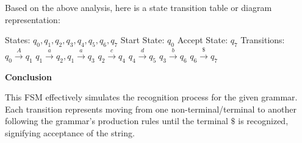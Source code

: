 Based on the above analysis, here is a state transition table or diagram representation:

States: \(q_0, q_1, q_2, q_3, q_4, q_5, q_6, q_7\)
Start State: \(q_0\)
Accept State: \(q_7\)
Transitions:
  \(q_0 \xrightarrow{A} q_1\)
  \(q_1 \xrightarrow{a} q_2, q_1 \xrightarrow{a} q_3\)
  \(q_2 \xrightarrow{c} q_4\)
  \(q_4 \xrightarrow{d} q_5\)
  \(q_3 \xrightarrow{b} q_6\)
  \(q_6 \xrightarrow{\$} q_7\)

\textbf{Conclusion}

This FSM effectively simulates the recognition process for the given grammar. Each transition represents moving from one non-terminal/terminal to another following the grammar's production rules until the terminal \( \$ \) is recognized, signifying acceptance of the string.
